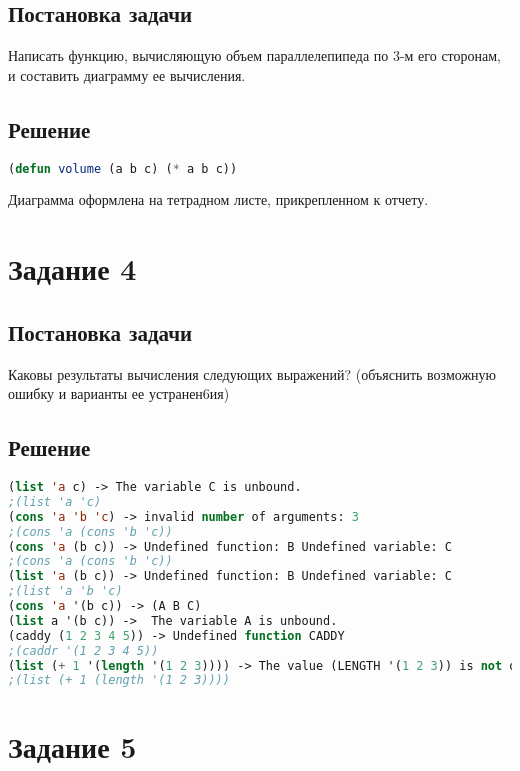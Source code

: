 \subsection*{Постановка задачи}
Написать функцию, вычисляющую объем параллелепипеда по 3-м его сторонам, и составить диаграмму ее вычисления.

\subsection*{Решение}

\begin{lstlisting}[label=third,caption=Решение задания №3, language=lisp]
(defun volume (a b c) (* a b c))
\end{lstlisting}

Диаграмма оформлена на тетрадном листе, прикрепленном к отчету.

\section*{Задание 4}
\subsection*{Постановка задачи}
Каковы результаты вычисления следующих выражений? (объяснить возможную ошибку и
варианты ее устранен6ия)

\subsection*{Решение}

\begin{lstlisting}[label=4xd,caption=Решение задания №4, language=lisp]
(list 'a c) -> The variable C is unbound.
;(list 'a 'c)
(cons 'a 'b 'c) -> invalid number of arguments: 3
;(cons 'a (cons 'b 'c))
(cons 'a (b c)) -> Undefined function: B Undefined variable: C
;(cons 'a (cons 'b 'c))
(list 'a (b c)) -> Undefined function: B Undefined variable: C
;(list 'a 'b 'c)
(cons 'a '(b c)) -> (A B C)
(list a '(b c)) ->  The variable A is unbound.
(caddy (1 2 3 4 5)) -> Undefined function CADDY
;(caddr '(1 2 3 4 5))
(list (+ 1 '(length '(1 2 3)))) -> The value (LENGTH '(1 2 3)) is not of type NUMBER
;(list (+ 1 (length '(1 2 3))))

\end{lstlisting}

\section*{Задание 5}
